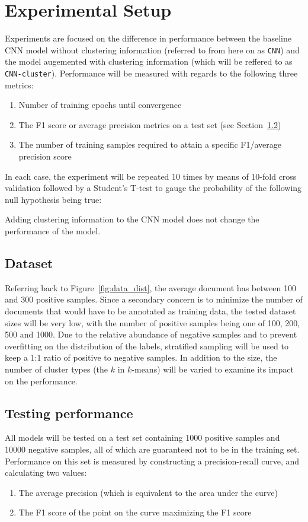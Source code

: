 \chapter{Experimental Setup}
Experiments are focused on the difference in performance between the baseline
CNN model without clustering information (referred to from here on as
\texttt{CNN}) and the model augemented with clustering information (which will
be reffered to as \texttt{CNN-cluster}). Performance will be measured with
regards to the following three metrics:
\begin{enumerate}
\item Number of training epochs until convergence
\item The F1 score or average precision metrics on a test set (see
  Section~\ref{sec:metrics})
\item The number of training samples required to attain a specific F1/average
  precision score
\end{enumerate}

In each case, the experiment will be repeated 10 times by means of 10-fold cross
validation followed by a Student's T-test to gauge the probability of the
following null hypothesis being true:
\begin{nullhypothesis}
  Adding clustering information to the CNN model does not change the
  performance of the model.
\end{nullhypothesis}

\section{Dataset}
Referring back to Figure~\ref{fig:data_dist}, the average document has between
100 and 300 positive samples. Since a secondary concern is to minimize the
number of documents that would have to be annotated as training data, the tested
dataset sizes will be very low, with the number of positive samples being one of
100, 200, 500 and 1000. Due to the relative abundance of negative samples and to
prevent overfitting on the distribution of the labels, stratified sampling will
be used to keep a 1:1 ratio of positive to negative samples. In addition to the
size, the number of cluster types (the $k$ in $k$-means) will be varied to
examine its impact on the performance.

\section{Testing performance}
\label{sec:metrics}
All models will be tested on a test set containing 1000 positive samples and
10000 negative samples, all of which are guaranteed not to be in the training
set. Performance on this set is measured by constructing a precision-recall
curve, and calculating two values:
\begin{enumerate}
\item The average precision (which is equivalent to the area under the curve)
\item The F1 score of the point on the curve maximizing the F1 score
\end{enumerate}

